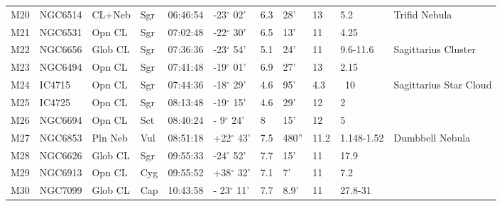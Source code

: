 \begin{longtable}{@{}lllllllllll@{}}
M20        & NGC6514     & CL+Neb     & Sgr       & 06:46:54 & -23$^{\circ}$ 02'  & 6.3       & 28'                  & 13       & 5.2                 & Trifid Nebula                             \\
M21        & NGC6531     & Opn CL     & Sgr       & 07:02:48 & -22$^{\circ}$ 30'  & 6.5       & 13'                  & 11       & 4.25                &                                           \\
M22        & NGC6656     & Glob CL    & Sgr       & 07:36:36 & -23$^{\circ}$ 54'  & 5.1       & 24'                  & 11       & 9.6-11.6            & Sagittarius Cluster                       \\
M23        & NGC6494     & Opn CL     & Sgr       & 07:41:48 & -19$^{\circ}$ 01'  & 6.9       & 27'                  & 13       & 2.15                &                                           \\
M24        & IC4715      & Opn CL     & Sgr       & 07:44:36 & -18$^{\circ}$ 29'  & 4.6       & 95'                  & 4.3      & ~10                 & Sagittarius Star Cloud                    \\
M25        & IC4725      & Opn CL     & Sgr       & 08:13:48 & -19$^{\circ}$ 15'  & 4.6       & 29'                  & 12       & 2                   &                                           \\
M26        & NGC6694     & Opn CL     & Sct       & 08:40:24 & - 9$^{\circ}$ 24'  & 8         & 15'                  & 12       & 5                   &                                           \\
M27        & NGC6853     & Pln Neb    & Vul       & 08:51:18 & +22$^{\circ}$ 43'  & 7.5       & 480''                & 11.2     & 1.148-1.52          & Dumbbell Nebula                           \\
M28        & NGC6626     & Glob CL    & Sgr       & 09:55:33 & -24$^{\circ}$ 52'  & 7.7       & 15'                  & 11       & 17.9                &                                           \\
M29        & NGC6913     & Opn CL     & Cyg       & 09:55:52 & +38$^{\circ}$ 32'  & 7.1       & 7'                   & 11       & 7.2                 &                                           \\
M30        & NGC7099     & Glob CL    & Cap       & 10:43:58 & - 23$^{\circ}$ 11' & 7.7       & 8.9'                 & 11       & 27.8-31             &                                           \\

\end{longtable}
